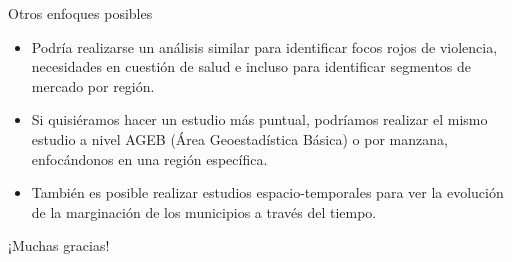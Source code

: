 \documentclass{beamer}
\begin{document}
\begin{frame}{Otros enfoques posibles}
  \begin{itemize}
    \item Podría realizarse un análisis similar para identificar focos rojos de violencia, necesidades en cuestión de salud e incluso para identificar segmentos de mercado por región.
    \item Si quisiéramos hacer un estudio más puntual, podríamos realizar el mismo estudio a nivel AGEB (Área Geoestadística Básica) o por manzana, enfocándonos en una región específica.
    \item También es posible realizar estudios espacio-temporales para ver la evolución de la marginación de los municipios a través del tiempo.
  \end{itemize}
\end{frame}

\begin{frame}
\centering
  \Huge{¡Muchas gracias!}
\end{frame}


  
\end{document}

